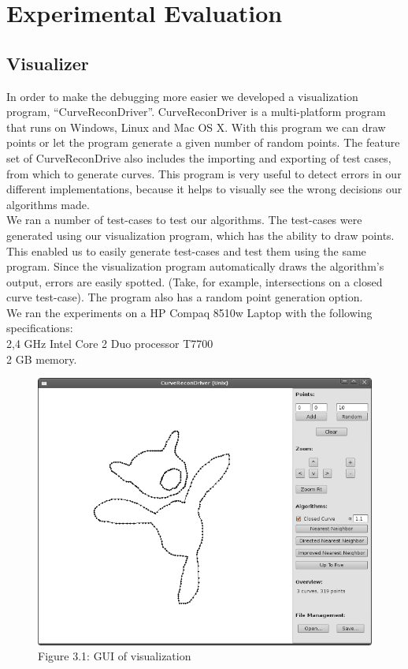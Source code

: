 \section{Experimental Evaluation}
\label{par:Discussion}

\subsection{Visualizer}
\label{sec:Vizualizer}
In order to make the debugging more easier we developed a visualization program, ``CurveReconDriver''. CurveReconDriver is a multi-platform program that runs on Windows, Linux and Mac OS X. With this program we can draw points or let the program generate a given number of random points. The feature set of CurveReconDrive also includes the importing and exporting of test cases, from which to generate curves. This program is very useful to detect errors in our different implementations, because it helps to visually see the wrong decisions our algorithms made.\\
We ran a number of test-cases to test our algorithms. The test-cases were generated using our visualization program, which has the ability to draw points. This enabled us to easily generate test-cases and test them using the same program. Since the visualization program automatically draws the algorithm's output, errors are easily spotted. (Take, for example, intersections on a closed curve test-case). The program also has a random point generation option.\\
We ran the experiments on a HP Compaq 8510w Laptop with the following specifications:\\
2,4 GHz Intel Core 2 Duo processor T7700\\
2 GB memory.\\

\begin{figure}[!h!b!t]
\begin{center}
  \includegraphics[scale=0.4]{Discussion/newdebugprogram.png}
  \label{fig:gui}\\
  Figure 3.1: GUI of visualization
\end{center}
\end{figure}

